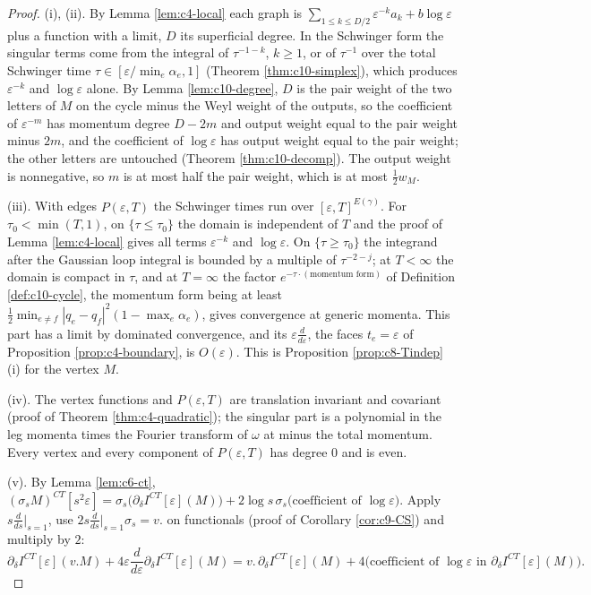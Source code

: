 \begin{proof}
(i), (ii). By Lemma \ref{lem:c4-local} each graph is $\sum_{1\le k\le D/2}\varepsilon^{-k}a_k+b\log\varepsilon$ plus a function with a limit, $D$ its superficial degree. In the Schwinger form the singular terms come from the integral of $\tau^{-1-k}$, $k\ge1$, or of $\tau^{-1}$ over the total Schwinger time $\tau\in[\varepsilon/\min_e\alpha_e,1]$ (Theorem \ref{thm:c10-simplex}), which produces $\varepsilon^{-k}$ and $\log\varepsilon$ alone. By Lemma \ref{lem:c10-degree}, $D$ is the pair weight of the two letters of $M$ on the cycle minus the Weyl weight of the outputs, so the coefficient of $\varepsilon^{-m}$ has momentum degree $D-2m$ and output weight equal to the pair weight minus $2m$, and the coefficient of $\log\varepsilon$ has output weight equal to the pair weight; the other letters are untouched (Theorem \ref{thm:c10-decomp}). The output weight is nonnegative, so $m$ is at most half the pair weight, which is at most $\tfrac12w_M$.

(iii). With edges $P(\varepsilon,T)$ the Schwinger times run over $[\varepsilon,T]^{E(\gamma)}$. For $\tau_0<\min(T,1)$, on $\{\tau\le\tau_0\}$ the domain is independent of $T$ and the proof of Lemma \ref{lem:c4-local} gives all terms $\varepsilon^{-k}$ and $\log\varepsilon$. On $\{\tau\ge\tau_0\}$ the integrand after the Gaussian loop integral is bounded by a multiple of $\tau^{-2-j}$; at $T<\infty$ the domain is compact in $\tau$, and at $T=\infty$ the factor $e^{-\tau\cdot(\text{momentum form})}$ of Definition \ref{def:c10-cycle}, the momentum form being at least $\tfrac12\min_{e\ne f}|q_e-q_f|^2(1-\max_e\alpha_e)$, gives convergence at generic momenta. This part has a limit by dominated convergence, and its $\varepsilon\frac d{d\varepsilon}$, the faces $t_e=\varepsilon$ of Proposition \ref{prop:c4-boundary}, is $O(\varepsilon)$. This is Proposition \ref{prop:c8-Tindep} (i) for the vertex $M$.

(iv). The vertex functions and $P(\varepsilon,T)$ are translation invariant and covariant (proof of Theorem \ref{thm:c4-quadratic}); the singular part is a polynomial in the leg momenta times the Fourier transform of $\omega$ at minus the total momentum. Every vertex and every component of $P(\varepsilon,T)$ has degree $0$ and is even.

(v). By Lemma \ref{lem:c6-ct}, $(\sigma_sM)^{CT}[s^2\varepsilon]=\sigma_s\big(\partial_\delta I^{CT}[\varepsilon](M)\big)+2\log s\,\sigma_s\big(\text{coefficient of }\log\varepsilon\big)$. Apply $s\frac d{ds}\big|_{s=1}$, use $2s\frac d{ds}\big|_{s=1}\sigma_s=v.$ on functionals (proof of Corollary \ref{cor:c9-CS}) and multiply by $2$:
\[
\partial_\delta I^{CT}[\varepsilon](v.M)+4\varepsilon\frac{d}{d\varepsilon}\partial_\delta I^{CT}[\varepsilon](M)=v.\,\partial_\delta I^{CT}[\varepsilon](M)+4\big(\text{coefficient of }\log\varepsilon\text{ in }\partial_\delta I^{CT}[\varepsilon](M)\big).
\]
\end{proof}

